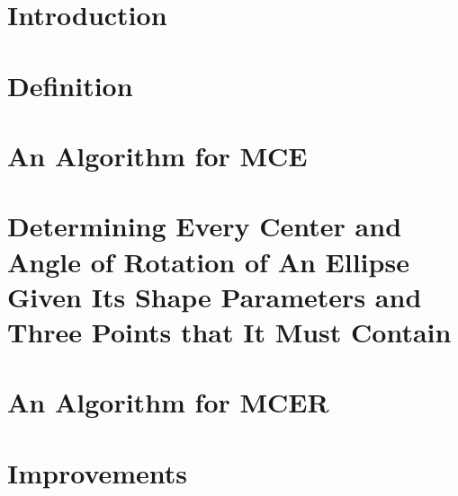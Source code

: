 \documentclass[3p, 11pt]{elsarticle}
\begin{document}
		
	

\section{Introduction}\label{section:introduction}



\section{Definition}\label{section:definition}


\section{An Algorithm for MCE}\label{section:mce}



\section{Determining Every Center and Angle of Rotation of An Ellipse Given {\color{Red} Its Shape Parameters} and Three Points that It Must Contain}\label{section:e3p}
	


\section{An Algorithm for MCER}\label{section:mcer}



\section{Improvements}\label{section:improvements}

%

%
\end{document}
